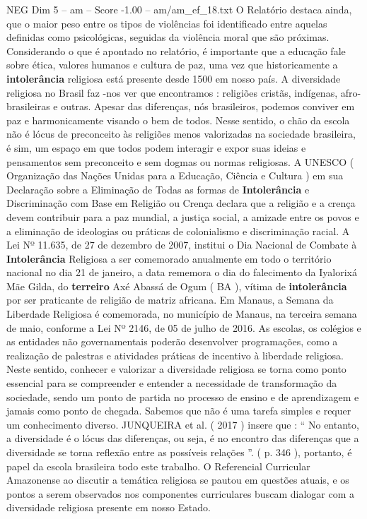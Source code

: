 \begin{textsample}{NEG Dim 5 – am – Score -1.00 – am/am\_ef\_18.txt}
O Relatório destaca ainda, que o maior peso entre os tipos de violências foi identificado entre aquelas definidas como psicológicas, seguidas da violência moral que são próximas.
Considerando o que é apontado no relatório, é importante que a educação fale sobre ética, valores humanos e cultura de paz, uma vez que historicamente a \textbf{intolerância} religiosa está presente desde 1500 em nosso país.
A diversidade religiosa no Brasil faz -nos ver que encontramos : religiões cristãs, indígenas, afro-brasileiras e outras.
Apesar das diferenças, nós brasileiros, podemos conviver em paz e harmonicamente visando o bem de todos.
Nesse sentido, o chão da escola não é lócus de preconceito às religiões menos valorizadas na sociedade brasileira, é sim, um espaço em que todos podem interagir e expor suas ideias e pensamentos sem preconceito e sem dogmas ou normas religiosas.
A UNESCO ( Organização das Nações Unidas para a Educação, Ciência e Cultura ) em sua Declaração sobre a Eliminação de Todas as formas de \textbf{Intolerância} e Discriminação com Base em Religião ou Crença declara que a religião e a crença devem contribuir para a paz mundial, a justiça social, a amizade entre os povos e a eliminação de ideologias ou práticas de colonialismo e discriminação racial.
A Lei Nº 11.635, de 27 de dezembro de 2007, institui o Dia Nacional de Combate à \textbf{Intolerância} Religiosa a ser comemorado anualmente em todo o território nacional no dia 21 de janeiro, a data rememora o dia do falecimento da Iyalorixá Mãe Gilda, do \textbf{terreiro} Axé Abassá de Ogum ( BA ), vítima de \textbf{intolerância} por ser praticante de religião de matriz africana.
Em Manaus, a Semana da Liberdade Religiosa é comemorada, no município de Manaus, na terceira semana de maio, conforme a Lei Nº 2146, de 05 de julho de 2016.
As escolas, os colégios e as entidades não governamentais poderão desenvolver programações, como a realização de palestras e atividades práticas de incentivo à liberdade religiosa.
Neste sentido, conhecer e valorizar a diversidade religiosa se torna como ponto essencial para se compreender e entender a necessidade de transformação da sociedade, sendo um ponto de partida no processo de ensino e de aprendizagem e jamais como ponto de chegada.
Sabemos que não é uma tarefa simples e requer um conhecimento diverso.
JUNQUEIRA et al. ( 2017 ) insere que : “ No entanto, a diversidade é o lócus das diferenças, ou seja, é no encontro das diferenças que a diversidade se torna reflexão entre as possíveis relações ”. ( p. 346 ), portanto, é papel da escola brasileira todo este trabalho.
O Referencial Curricular Amazonense ao discutir a temática religiosa se pautou em questões atuais, e os pontos a serem observados nos componentes curriculares buscam dialogar com a diversidade religiosa presente em nosso Estado.

\end{textsample}
